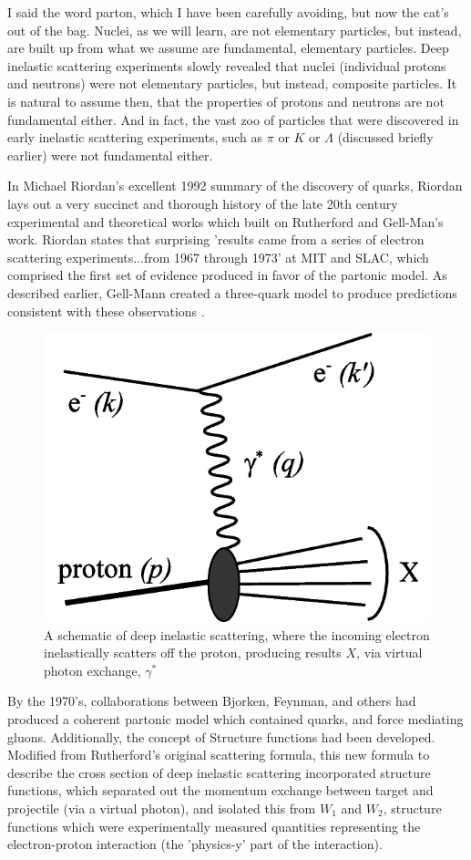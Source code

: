 I said the word parton, which I have been carefully avoiding, but now the cat's
out of the bag. Nuclei, as we will learn, are not elementary particles, but
instead, are built up from what we assume are fundamental, elementary particles.
Deep inelastic scattering experiments slowly revealed that nuclei (individual
protons and neutrons) were not elementary particles, but instead, composite
particles. It is natural to assume then, that the properties of protons and
neutrons are not fundamental either. And in fact, the vast zoo of particles that
were discovered in early inelastic scattering experiments, such as $\pi$ or $K$
or $\Lambda$ (discussed briefly earlier) were not fundamental either.

In Michael Riordan's excellent 1992 summary of the discovery of quarks, Riordan
lays out a very succinct and thorough history of the late 20th century
experimental and theoretical works which built on Rutherford and Gell-Man's
work. Riordan states that surprising 'results came from a
series of electron scattering experiments...from 1967 through 1973' at MIT and
SLAC, which comprised the first set of evidence produced in favor of the
partonic model. As described earlier, Gell-Mann created a three-quark model to
produce predictions consistent with these observations \cite{Riordan1992}.

\begin{figure}[ht]
	\centering
	\includegraphics[width=0.6\linewidth]{./figures/deep_inelastic_basic.png}
	\caption{
		A schematic of deep inelastic scattering, where the incoming electron
		inelastically scatters off the proton, producing results $X$, via virtual
		photon exchange, $\gamma^*$  \cite{Ddn2_2008}
	}
	\label{fig:disschematic}
\end{figure}

By the 1970's, collaborations between Bjorken, Feynman, and others had produced a
coherent partonic model which contained quarks, and force mediating gluons.
Additionally, the concept of Structure functions had been developed. Modified
from Rutherford's original scattering formula, this new formula to describe the
cross section of deep inelastic scattering incorporated structure functions,
which separated out the momentum exchange between target and projectile (via a
virtual photon), and isolated this from $W_1$ and $W_2$, structure functions
which were experimentally measured quantities representing the electron-proton
interaction (the 'physics-y' part of the interaction).

